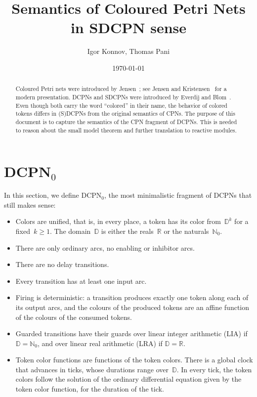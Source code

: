 \documentclass[11pt]{article}
\title{Semantics of Coloured Petri Nets in SDCPN sense}
\author{Igor Konnov, Thomas Pani}
\date{\today}
\theoremstyle{definition}
\newcommand{\NatZero}{\mathbb{N}_0}
\newcommand{\Real}{\mathbb{R}}
\newcommand{\Dom}{\mathbb{D}}
\newcommand{\DCPN}[1]{\texorpdfstring{\textup{DCPN}\ensuremath{_{#1}}}{DCPN#1}}
\begin{document}
\maketitle

\begin{abstract}
Coloured Petri nets were introduced by Jensen~\cite{Jensen1981}; see Jensen and
Kristensen~\cite{JensenKristensen2009} for a modern presentation. DCPNs and SDCPNs were introduced by
Everdij and Blom~\cite{EverdijBlom2005,EverdijBlom2006}. Even though both carry the word
``colored'' in their name, the behavior of colored tokens differs in (S)DCPNs
from the original semantics of CPNs. The purpose of this document is to capture
the semantics of the CPN fragment of DCPNs. This is needed to reason about
the small model theorem and further translation to reactive modules.
\end{abstract}

\section{\DCPN{0}}

In this section, we define \DCPN{0}, the most minimalistic fragment of DCPNs
that still makes sense:

\begin{itemize}
  \item Colors are unified, that is, in every place, a token has its color
    from~$\Dom^k$ for a fixed~$k \ge 1$. The domain~$\Dom$ is either the
    reals~$\Real$ or the naturals~$\NatZero$.

  \item There are only ordinary arcs, no enabling or inhibitor arcs.

  \item There are no delay transitions.

  \item Every transition has at least one input arc.

  \item Firing is deterministic: a transition produces exactly one token along
    each of its output arcs, and the colours of the produced tokens are an
    affine function of the colours of the consumed tokens.

  \item Guarded transitions have their guards over linear integer arithmetic
    (LIA) if $\Dom = \NatZero$, and over linear real arithmetic (LRA) if
    $\Dom = \Real$.

  \item Token color functions are functions of the token colors. There is a
    global clock that advances in ticks, whose durations range over~$\Dom$.
    In every tick, the token colors follow the solution of the ordinary
    differential equation given by the token color function, for the
    duration of the tick.
\end{itemize}
\end{document}

